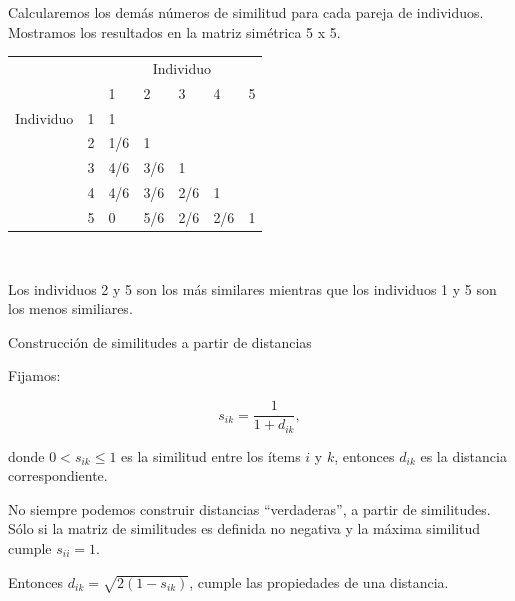 \documentclass[spanish]{beamer}
\begin{document}
\begin{frame}{}
Calcularemos los demás números de similitud para cada pareja de individuos. Mostramos los resultados en la matriz simétrica 5 x 5.

\begin{table}[H]
\centering
\resizebox{9cm}{!} {
\begin{tabular}{lllllll}
\multicolumn{2}{l}{\multirow{}{}{}}               & \multicolumn{5}{c}{Individuo}                  \\
\multicolumn{2}{l}{}                                & 1   & 2   & 3   & 4   & 5                      \\ \cline{3-3} \cline{7-7} 
\multirow{}{}{Individuo} & \multicolumn{1}{l|}{1} & 1   &     &     &     & \multicolumn{1}{l|}{}  \\
                           & \multicolumn{1}{l|}{2} & 1/6 & 1   &     &     & \multicolumn{1}{l|}{}  \\
                           & \multicolumn{1}{l|}{3} & 4/6 & 3/6 & 1   &     & \multicolumn{1}{l|}{}  \\
                           & \multicolumn{1}{l|}{4} & 4/6 & 3/6 & 2/6 & 1   & \multicolumn{1}{l|}{}  \\
                           & \multicolumn{1}{l|}{5} & 0   & 5/6 & 2/6 & 2/6 & \multicolumn{1}{l|}{1} \\ \cline{3-3} \cline{7-7} 
\end{tabular}
}
\end{table}\

Los individuos 2 y 5 son los más similares mientras que los individuos 1 y 5 son los menos similiares.
\end{frame}

\begin{frame}{Construcción de similitudes a partir de distancias}

Fijamos:

$$ s_{ik} = \frac{1}{1+d_{ik}},$$ 

donde $0<s_{ik}\leq 1$ es la similitud entre los ítems $i$ y $k$, entonces $d_{ik}$ es la distancia correspondiente.\break

No siempre podemos construir distancias ``verdaderas'', a partir de similitudes. Sólo si la matriz de similitudes es definida no negativa y la máxima similitud cumple $s_{ii}=1$.\break

Entonces $ d_{ik}=\sqrt{2(1-s_{ik})}$, cumple las propiedades de una distancia.
\end{frame}
\end{document}
